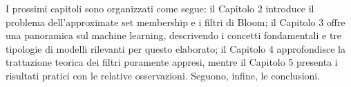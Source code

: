I prossimi capitoli sono organizzati come segue: il Capitolo 2 introduce il problema dell'approximate set membership e i filtri di Bloom; il Capitolo 3 offre una panoramica sul machine learning, descrivendo i concetti fondamentali e tre tipologie di modelli rilevanti per questo elaborato; il Capitolo 4 approfondisce la trattazione teorica dei filtri puramente appresi, mentre il Capitolo 5 presenta i risultati pratici con le relative osservazioni. Seguono, infine, le conclusioni.